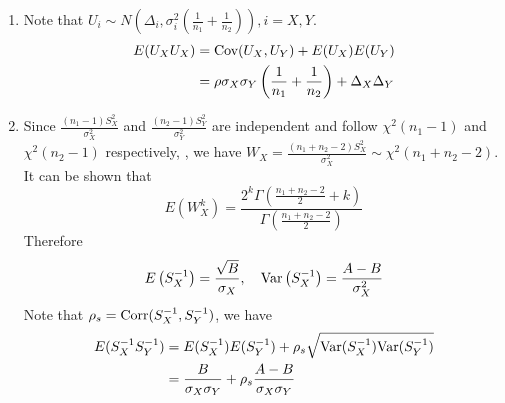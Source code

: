 \begin{enumerate}
	\item Note that $U_i\sim N\left(\Delta_i, \sigma_i^2(\frac{1}{n_1} + \frac{1}{n_2})\right), 
	i=X, Y$. 
	\begin{equation}\label{eq1}
	\begin{aligned}
	E(U_XU_X)&= \text{Cov}(U_X, U_Y) + E(U_X)E(U_Y) \\
	&= \rho\sigma_X\sigma_Y\left(\frac{1}{n_1} + \frac{1}{n_2}\right) +
	\Delta_X\Delta_Y
	\end{aligned} 
	\end{equation}
	
	\item Since $\frac{(n_1-1)S_{X}^2}{\sigma_X^2}$ and $\frac{(n_2-1)S_{Y}^2}{\sigma_Y^2}$ are
	independent and follow $\chi^2(n_1-1)$ and $\chi^2(n_2 -1)$ respectively, , we have 
	$W_{X}=\frac{(n_1 + n_2 -2)S_X^2}{\sigma_X^2}\sim
	\chi^2(n_1 + n_2-2)$. It can be shown that 
	\[E(W_{X}^k)= \frac{2^k\Gamma(\frac{n_1 + n_2 -2}{2}+k)}{\Gamma(\frac{n_1 + n_2 -2}{2})}\] 
	Therefore 
	\begin{equation}
	\begin{aligned}
	E\left(S_X^{-1}\right) =
	\frac{\sqrt{B}}{\sigma_X},		~~~\text{Var}\left(S_X^{-1}\right) = \frac{A-B}{\sigma_X^2}
	\end{aligned}
	\end{equation}
	Note that $\rho_s = \text{Corr}(S_X^{-1}, S_Y^{-1})$, we have 
	\begin{equation}\label{eq2}
	\begin{aligned}
	E(S_X^{-1}S_Y^{-1})  &= E(S_X^{-1})E(S_Y^{-1}) + \rho_s
	\sqrt{\text{Var}(S_X^{-1})\text{Var}(S_Y^{-1})} \\
	& = \frac{B}{\sigma_X\sigma_Y} + \rho_s
	\frac{A-B}{\sigma_X\sigma_Y}
	\end{aligned}
	\end{equation}
	

\end{enumerate}
